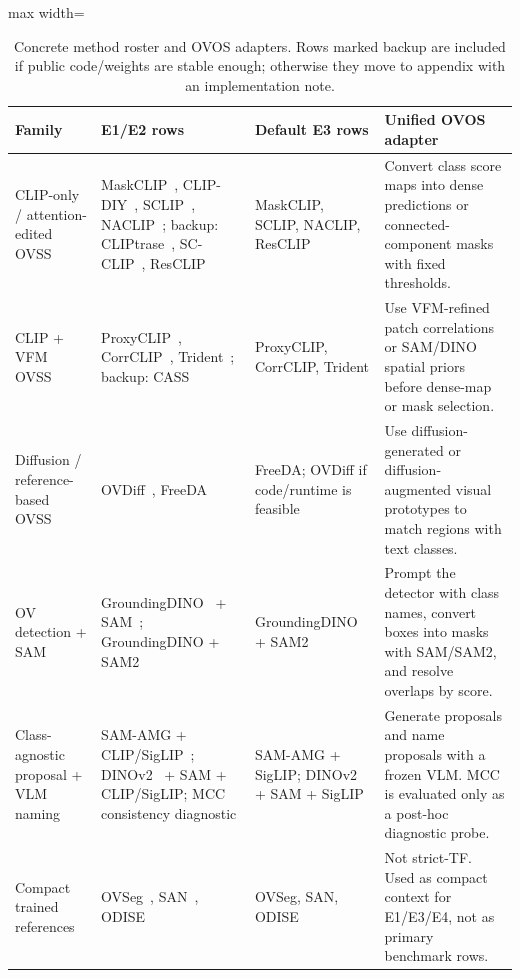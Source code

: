 \documentclass[11pt,a4paper]{article}
\begin{document}
\begin{table}[!htbp]
\centering
\scriptsize
\caption{Concrete method roster and OVOS adapters. Rows marked backup are included if public code/weights are stable enough; otherwise they move to appendix with an implementation note.}
\label{tab:families}
\setlength{\tabcolsep}{3pt}
\begin{adjustbox}{max width=\textwidth}
\begin{tabular}{p{} p{} p{} p{}}
\toprule
Family & E1/E2 rows & Default E3 rows & Unified OVOS adapter \\
\midrule
CLIP-only / attention-edited OVSS &
MaskCLIP~\cite{maskclip2022}, CLIP-DIY~\cite{clipdiy2024}, SCLIP~\cite{sclip2024}, NACLIP~\cite{naclip2025}; backup: CLIPtrase~\cite{cliptrase2024}, SC-CLIP~\cite{scclip2025}, ResCLIP~\cite{resclip2025} &
MaskCLIP, SCLIP, NACLIP, ResCLIP &
Convert class score maps into dense predictions or connected-component masks with fixed thresholds. \\
\addlinespace[2pt]
CLIP + VFM OVSS &
ProxyCLIP~\cite{proxyclip2024}, CorrCLIP~\cite{corrclip2025}, Trident~\cite{trident2024}; backup: CASS~\cite{cass2025} &
ProxyCLIP, CorrCLIP, Trident &
Use VFM-refined patch correlations or SAM/DINO spatial priors before dense-map or mask selection. \\
\addlinespace[2pt]
Diffusion / reference-based OVSS &
OVDiff~\cite{ovdiff2024}, FreeDA~\cite{freeda2024} &
FreeDA; OVDiff if code/runtime is feasible &
Use diffusion-generated or diffusion-augmented visual prototypes to match regions with text classes. \\
\addlinespace[2pt]
OV detection + SAM &
GroundingDINO~\cite{groundingdino2023} + SAM~\cite{sam2023}; GroundingDINO + SAM2~\cite{sam22024} &
GroundingDINO + SAM2 &
Prompt the detector with class names, convert boxes into masks with SAM/SAM2, and resolve overlaps by score. \\
\addlinespace[2pt]
Class-agnostic proposal + VLM naming &
SAM-AMG + CLIP/SigLIP~\cite{clip2021,siglip2023}; DINOv2~\cite{dinov22023} + SAM + CLIP/SigLIP; MCC consistency diagnostic &
SAM-AMG + SigLIP; DINOv2 + SAM + SigLIP &
Generate proposals and name proposals with a frozen VLM. MCC is evaluated only as a post-hoc diagnostic probe. \\
\addlinespace[2pt]
Compact trained references &
OVSeg~\cite{ovseg2023}, SAN~\cite{san2023}, ODISE~\cite{odise2023} &
OVSeg, SAN, ODISE &
Not strict-TF. Used as compact context for E1/E3/E4, not as primary benchmark rows. \\
\bottomrule
\end{tabular}
\end{adjustbox}
\end{table}
\end{document}
